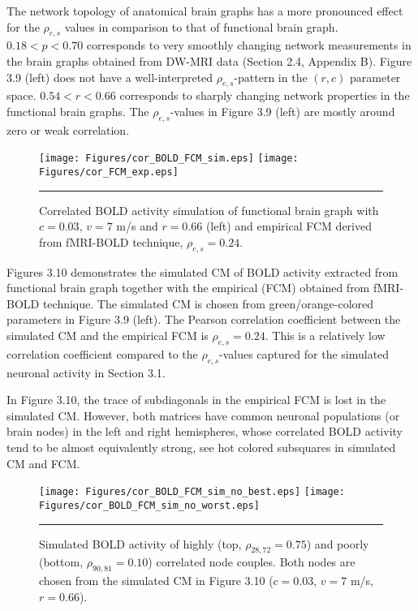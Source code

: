 The network topology of anatomical brain graphs has a more pronounced effect for the $\rho_{e,s}$ values in comparison to that of functional brain graph. $0.18<p<0.70$ corresponds to very smoothly changing network measurements in the brain graphs obtained from DW-MRI data (Section 2.4, Appendix B). Figure 3.9 (left) does not have a well-interpreted $\rho_{e,s}$-pattern in the $(r,c)$ parameter space. $0.54<r<0.66$ corresponds to sharply changing network properties in the functional brain graphs. The $\rho_{e,s}$-values in Figure 3.9 (left) are mostly around zero or weak correlation.



\begin{figure}[htbp]
 
  \centering
	 \texttt{[image: Figures/cor\_BOLD\_FCM\_sim.eps]} 
   	 \texttt{[image: Figures/cor\_FCM\_exp.eps]} 

    \rule{35em}{0.5pt}
  \caption[High Correlated BOLD Simulation, FCM]{Correlated BOLD activity simulation of functional brain graph with $c=0.03$, $v=7$ m/s and $r=0.66$ (left) and empirical FCM derived from fMRI-BOLD technique, $\rho_{e,s} = 0.24$.} 
    \label{fig:High Correlated BOLD Simulation, FCM}
 	
\end{figure}  



Figures 3.10 demonstrates the simulated CM of BOLD activity extracted from functional brain graph together with the empirical (FCM) obtained from fMRI-BOLD technique. The simulated CM is chosen from green/orange-colored parameters in Figure 3.9 (left). The Pearson correlation coefficient between the simulated CM and the empirical FCM is $\rho_{e,s} = 0.24$. This is a relatively low correlation coefficient compared to the $\rho_{e,s}$-values captured for the simulated neuronal activity in Section 3.1.

In Figure 3.10, the trace of subdiagonals in the empirical FCM is lost in the simulated CM. However, both matrices have common neuronal populations (or brain nodes) in the left and right hemispheres, whose correlated BOLD activity tend to be almost equivalently strong, see hot colored subsquares in simulated CM and FCM.



\begin{figure}[htbp]
 
  \centering
	 \texttt{[image: Figures/cor\_BOLD\_FCM\_sim\_no\_best.eps]} 
   	 \texttt{[image: Figures/cor\_BOLD\_FCM\_sim\_no\_worst.eps]} 

    \rule{35em}{0.5pt}
  \caption[BOLD Activity Node Dynamics, FCM]{Simulated BOLD activity of highly (top, $\rho_{28,72}=0.75$) and poorly (bottom, $\rho_{90,81}=0.10$) correlated node couples. Both nodes are chosen from the simulated CM in Figure 3.10 ($c=0.03$, $v=7$ m/s, $r=0.66$).} 
    \label{fig:BOLD Activity Node Dynamics, FCM}
 	
\end{figure} 

